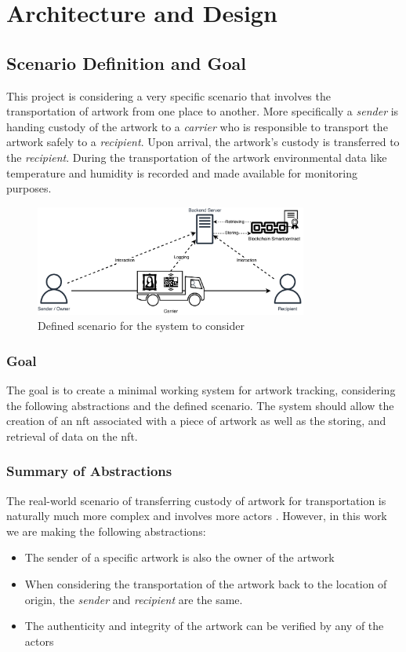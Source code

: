 \chapter{Architecture and Design}

\section{Scenario Definition and Goal}
\label{sec:scenario_definition}
This project is considering a very specific scenario that involves the transportation of artwork from one place to another. More specifically a \textit{sender} is handing custody of the artwork to a \textit{carrier} who is responsible to transport the artwork safely to a \textit{recipient}. Upon arrival, the artwork's custody is transferred to the \textit{recipient}. During the transportation of the artwork environmental data like temperature and humidity is recorded and made available for monitoring purposes.

\begin{figure}[ht]
    \centering
    \includegraphics[width=0.8\textwidth]{diagrams/Scenario.drawio.pdf}
    \caption{Defined scenario for the system to consider}
    \label{fig:scenario}
\end{figure}

\subsection*{Goal}
The goal is to create a minimal working system for artwork tracking, considering the following abstractions and the defined scenario. The system should allow the creation of an \gls{nft} associated with a piece of artwork as well as the storing, and retrieval of data on the \gls{nft}.

\subsection*{Summary of Abstractions}
The real-world scenario of transferring custody of artwork for transportation is naturally much more complex and involves more actors \cite{artintransit}. However, in this work we are making the following abstractions:
\begin{itemize}
    \item The sender of a specific artwork is also the owner of the artwork
    \item When considering the transportation of the artwork back to the location of origin, the \textit{sender} and \textit{recipient} are the same.
    \item The authenticity and integrity of the artwork can be verified by any of the actors
\end{itemize}



